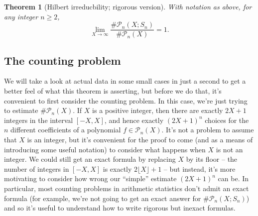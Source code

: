 \documentclass[12pt]{amsart}
\newtheorem{theorem}{Theorem}
\theoremstyle{definition} \newtheorem*{notation}{Notation}
\theoremstyle{remark} \newtheorem*{remark}{Remark}
\theoremstyle{remark} \newtheorem*{example}{Example}
\theoremstyle{definition} \newtheorem*{definition}{Definition}
\numberwithin{equation}{section}
\numberwithin{theorem}{section}
\begin{document}
	\begin{theorem}[Hilbert irreducbility; rigorous version] \label{thm:hilbert-irreducibility}
		With notation as above, for any integer $n \geq 2$,
			\[
				\lim_{X \to \infty} \frac{\#\mathcal{P}_n(X;S_n)}{\#\mathcal{P}_n(X)} = 1.
			\]
	\end{theorem}
	
	\subsection{The counting problem}
	
	We will take a look at actual data in some small cases in just a second to get a better feel of what this theorem is asserting, but before we do that, it's convenient to first consider the counting problem.  In this case, we're just trying to estimate $\#\mathcal{P}_n(X)$.  If $X$ is a positive integer, then there are exactly $2X+1$ integers in the interval $[-X,X]$, and hence exactly $(2X+1)^n$ choices for the $n$ different coefficients of a polynomial $f \in \mathcal{P}_n(X)$.  It's not a problem to assume that $X$ is an integer, but it's convenient for the proof to come (and as a means of introducing some useful notation) to consider what happens when $X$ is not an integer.  We could still get an exact formula by replacing $X$ by its floor -- the number of integers in $[-X,X]$ is exactly $2\lfloor X\rfloor + 1$ -- but instead, it's more motivating to consider how wrong our ``simple'' estimate $(2X+1)^n$ can be.  In particular, most counting problems in arithmetic statistics don't admit an exact formula (for example, we're not going to get an exact answer for $\#\mathcal{P}_n(X;S_n)$) and so it's useful to understand how to write rigorous but inexact formulas.
	
\end{document}
